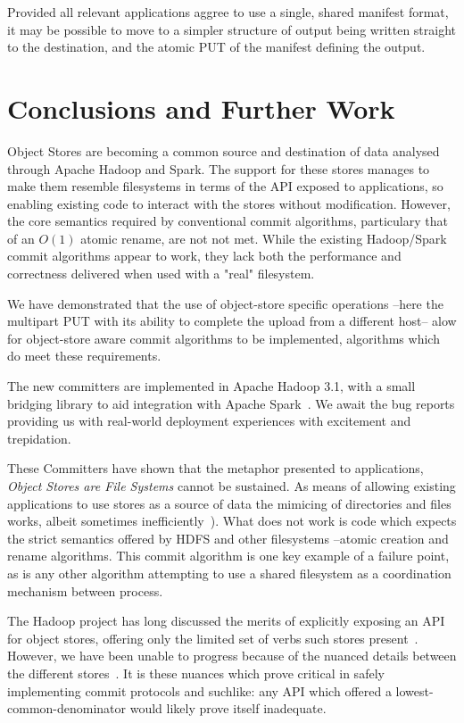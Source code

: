 \documentclass[conference]{IEEEtran}
\begin{document}
Provided all relevant applications aggree to use a single, shared manifest
format, it may be possible to move to a simpler structure of
output being written straight to the destination, and the atomic PUT of the
manifest defining the output.


\section{Conclusions and Further Work}
\label{sec:conclusions}

Object Stores are becoming a common source and destination of data analysed
through Apache Hadoop and Spark.
The support for these stores manages to make them resemble filesystems in
terms of the API exposed to applications, so enabling existing code to
interact with the stores without modification.
However, the core semantics required by conventional commit algorithms, particulary
that of an $O(1)$ atomic rename, are not not met.
While the existing Hadoop/Spark commit algorithms appear to work, they lack
both the performance and correctness delivered when used with a "real" filesystem.

We have demonstrated that the use of object-store specific operations --here
the multipart PUT with its ability to complete the upload from a different host--
alow for object-store aware commit algorithms to be implemented,
algorithms which do meet these requirements.

The new committers are implemented in Apache Hadoop 3.1, with a small bridging
library to aid integration with Apache Spark\ \cite{HADOOP-13786}.
We await the bug reports providing us with real-world deployment experiences
with excitement and trepidation.


These Committers have shown that the metaphor presented to applications,
\emph{Object Stores are File Systems} cannot be sustained.
As means of allowing existing applications to use stores as a source
of data the mimicing of directories and files works, albeit sometimes
inefficiently\ \cite{HADOOP-13208}).
What does not work is code which expects the strict semantics
offered by HDFS and other filesystems --atomic creation and rename algorithms.
This commit algorithm is one key example of a failure point, as
is any other algorithm attempting to use a shared filesystem
as a coordination mechanism between process.

The Hadoop project has long discussed the merits of explicitly
exposing an API for object stores, offering only the limited
set of verbs such stores present\ \cite{HADOOP-9565}.
However, we have been unable to progress because of the nuanced details
between the different stores\ \cite{S3, WASB, ADL, GCS}.
It is these nuances which prove critical in safely implementing
commit protocols and suchlike: any API which offered a lowest-common-denominator
would likely prove itself inadequate.
\end{document}
